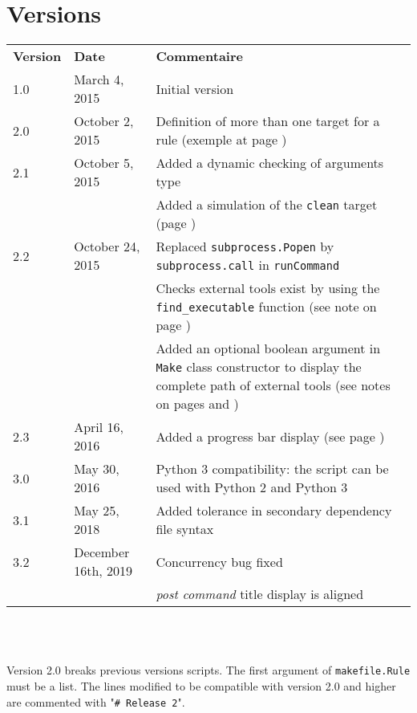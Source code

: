 \documentclass[a4paper,11pt]{extarticle}
\begin{document}
\section{Versions}
  \begin{tabular}{llp{10.5cm}}
    \textbf{Version} & \textbf{Date} & \textbf{Commentaire}\\
    1.0 & March 4, 2015 & Initial version \\
    2.0 & October 2, 2015 & Definition of more than one target for a rule (exemple at page \pageref{plusieursCibles})\\
    2.1 & October 5, 2015 & Added a dynamic checking of arguments type\\
        &                & Added a simulation of the \texttt{clean} target (page \pageref{simulationButClean})\\
    2.2 & October 24, 2015 & Replaced \texttt{subprocess.Popen} by \texttt{subprocess.call} in \texttt{runCommand}\\
        &                & Checks external tools exist by using the \texttt{find\_executable} function (see note on page \pageref{verifUtilitaire})\\
        &                & Added an optional boolean argument in \texttt{Make} class constructor to display the complete path of external tools (see notes on pages \pageref{logUtilityToolPath} and \pageref{logUtilityToolPath2})\\
    2.3 & April 16, 2016 & Added a progress bar display (see page \pageref{affichagePourcentage})\\
    3.0 & May 30, 2016 & Python 3 compatibility: the script can be used with Python 2 and Python 3\\
    3.1 & May 25, 2018 & Added tolerance in secondary dependency file syntax\\
    3.2 & December 16th, 2019 & Concurrency bug fixed\\
        &                     & \emph{post command} title display is aligned\\

  \end{tabular}
\\~

Version 2.0 breaks previous versions scripts. The first argument of \texttt{makefile.Rule} must be a list. The lines modified to be compatible with version 2.0 and higher are commented with "\texttt{\# Release 2}".

\end{document}
